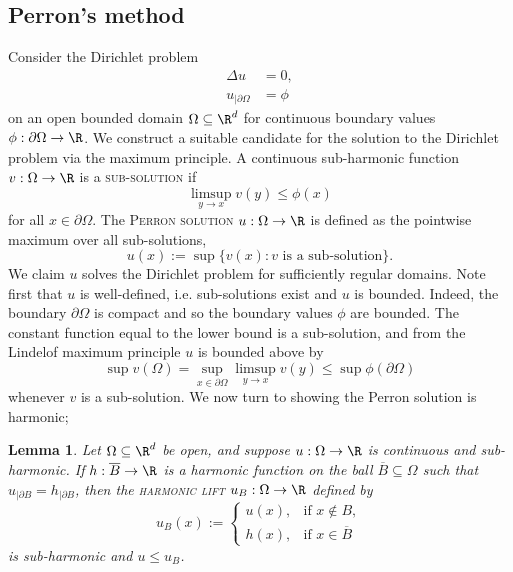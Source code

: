 \documentclass[reqno]{amsart}
\newtheorem{lemma}[theorem]{Lemma}
\theoremstyle{definition}
\theoremstyle{remark}
\renewcommand{\emph}{\textsc}
\begin{document}
\subsection{Perron's method}

Consider the Dirichlet problem
	\begin{align*}
		\Delta u
			&= 0, \\
		u_{|\partial \Omega} 
			&= \phi	
	\end{align*}
on an open bounded domain $\Omega \subseteq \R^d$ for continuous boundary values $\phi : \partial \Omega \to \R$. We construct a suitable candidate for the solution to the Dirichlet problem via the maximum principle. A continuous sub-harmonic function $v : \Omega \to \R$ is a \emph{sub-solution} if 
	\[ \limsup_{y \to x} v(y) \leq \phi(x) \]
for all $x \in \partial \Omega$. The \emph{Perron solution} $u: \Omega \to \R$ is defined as the pointwise maximum over all sub-solutions, 
	\[ u (x) := \sup\{ v(x) : \text{$v$ is a sub-solution} \}. \]
We claim $u$ solves the Dirichlet problem for sufficiently regular domains. Note first that $u$ is well-defined, i.e. sub-solutions exist and $u$ is bounded. Indeed, the boundary $\partial \Omega$ is compact and so the boundary values $\phi$ are bounded. The constant function equal to the lower bound is a sub-solution, and from the Lindelof maximum principle $u$ is bounded above by 
	\[ \sup v(\Omega) = \sup_{x \in \partial \Omega} \limsup_{y \to x} v(y) \leq \sup \phi(\partial \Omega) \]
whenever $v$ is a sub-solution. We now turn to showing the Perron solution is harmonic;

\begin{lemma}
	Let $\Omega \subseteq \R^d$ be open, and suppose $u: \Omega \to \R$ is continuous and sub-harmonic. If $h : \overline B \to \R$ is a harmonic function on the ball $\overline B \subseteq \Omega$ such that $u_{|\partial B} = h_{|\partial B}$, then the \emph{harmonic lift} $u_B : \Omega \to \R$ defined by
		\[ u_B (x)
			:=
			\begin{cases}
				u(x), 		&\text{if }x \not\in B, \\
				h(x), 		&\text{if }x \in \overline B 
			\end{cases}
		 \]
	is sub-harmonic and $u \leq u_B$.  
\end{lemma}
\end{document}
